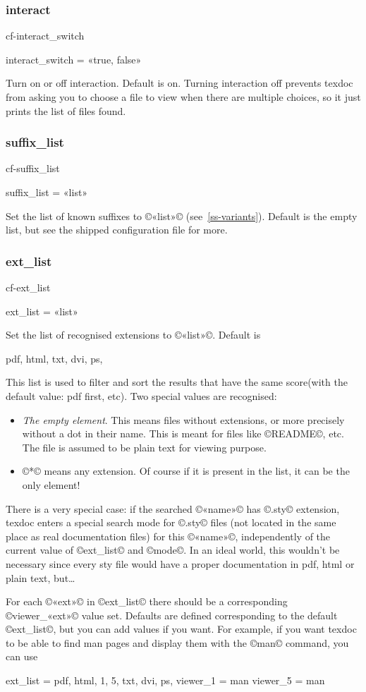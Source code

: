 \documentclass[a4paper, oneside]{scrartcl}
\makeatletter
\newif\ifframed
\newenvironment{cmdsubsub}[2]{%
  \framedfalse \commandes\subsubsection{#1}{#2}%
  }{%
  \endcommandes}
\newenvironment{htcode}{%
  \SaveVerbatim[samepage, gobble=2]{verbmat}%
  }{%
  \endSaveVerbatim
  \par\medskip\noindent\hspace*{\parindent}%
  \BUseVerbatim{verbmat}%
  \par\medskip\@endpetrue}
\makeatother
\begin{document}
\begin{cmdsubsub}{interact}{cf-interact_switch}
  interact_switch = «true, false»
\end{cmdsubsub}

Turn on or off interaction.  Default is on.  Turning interaction off prevents
texdoc from asking you to choose a file to view when there are multiple
choices, so it just prints the list of files found.

\begin{cmdsubsub}{suffix_list}{cf-suffix_list}
  suffix_list = «list»
\end{cmdsubsub}

Set the list of known suffixes to ©«list»© (see~\ref{ss-variants}). Default is
the empty list, but see the shipped configuration file for more.

\begin{cmdsubsub}{ext_list}{cf-ext_list}
  ext_list = «list»
\end{cmdsubsub}

Set the list of recognised extensions to ©«list»©.  Default is
\begin{htcode}
  pdf, html, txt, dvi, ps,
\end{htcode}
This list is used to filter and  sort the results that have the same
score(with the default value: pdf first, etc).  Two special values are
recognised:
\begin{itemize}
  \item \emph{The empty element}. This means files without extensions, or more
    precisely without a dot in their name.  This is meant for files like
    ©README©, etc.  The file is assumed to be plain text for viewing purpose.
  \item ©*© means any extension.  Of course if it is present in the list, it
    can be the only element!
\end{itemize}

There is a very special case: if the searched ©«name»© has ©.sty© extension,
texdoc enters a special search mode for ©.sty© files (not located in the same
place as real documentation files) for this ©«name»©, independently of the
current value of ©ext_list© and ©mode©. In an ideal world, this wouldn't be
necessary since every sty file would have a proper documentation in pdf, html
or plain text, but\dots

For each ©«ext»© in ©ext_list© there should be a corresponding ©viewer_«ext»©
value set.  Defaults are defined corresponding to the default ©ext_list©, but
you can add values if you want.  For example, if you want texdoc to be able
to find man pages and display them with the ©man© command, you can use
\begin{htcode}
  ext_list = pdf, html, 1, 5, txt, dvi, ps,
  viewer_1 = man
  viewer_5 = man
\end{htcode}
\end{document}
